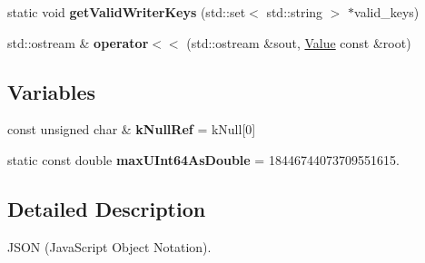 \begin{DoxyCompactItemize}
\item 
\hypertarget{namespace_json_a45c3c8847f03b09cd61035e615d1d820}{}static void {\bfseries get\+Valid\+Writer\+Keys} (std\+::set$<$ std\+::string $>$ $\ast$valid\+\_\+keys)\label{namespace_json_a45c3c8847f03b09cd61035e615d1d820}

\item 
\hypertarget{namespace_json_af64fba09a9679b8b8cb50dd3e85f6fd5}{}std\+::ostream \& {\bfseries operator$<$$<$} (std\+::ostream \&sout, \hyperlink{class_json_1_1_value}{Value} const \&root)\label{namespace_json_af64fba09a9679b8b8cb50dd3e85f6fd5}

\end{DoxyCompactItemize}
\subsection*{Variables}
\begin{DoxyCompactItemize}
\item 
\hypertarget{namespace_json_ab30055b4bbd82aecaca57ccecd63bbe6}{}const unsigned char \& {\bfseries k\+Null\+Ref} = k\+Null\mbox{[}0\mbox{]}\label{namespace_json_ab30055b4bbd82aecaca57ccecd63bbe6}

\item 
\hypertarget{namespace_json_aecc0306aa526f25c5156f842182fb7fb}{}static const double {\bfseries max\+U\+Int64\+As\+Double} = 18446744073709551615.\label{namespace_json_aecc0306aa526f25c5156f842182fb7fb}

\end{DoxyCompactItemize}


\subsection{Detailed Description}
J\+S\+O\+N (Java\+Script Object Notation). 

